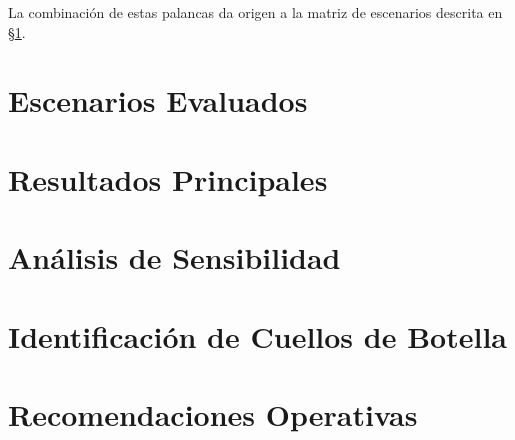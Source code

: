 \documentclass[10pt, a4paper]{article}
\begin{document}
La combinaci\'on de estas palancas da origen a la matriz de escenarios
descrita en \S\ref{sec:escenarios}.

\newpage

\section{Escenarios Evaluados}
\label{sec:escenarios}


\newpage

\section{Resultados Principales}
\label{sec:resultados}


\newpage

\section{An\'alisis de Sensibilidad}
\label{sec:sensibilidad}


\newpage

\section{Identificaci\'on de Cuellos de Botella}
\label{sec:cuellos}


\newpage

\section{Recomendaciones Operativas}
\label{sec:recomendaciones}
\end{document}
